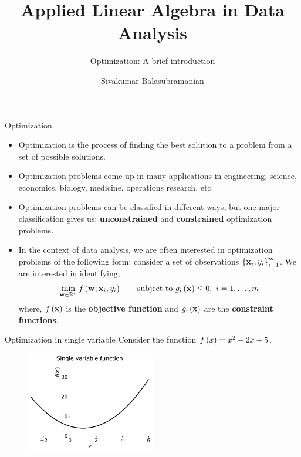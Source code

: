 \documentclass[aspectratio=169]{beamer}
\title{Applied Linear Algebra in Data Analysis}
\subtitle{Optimization: A brief introduction}
\author{Sivakumar Balasubramanian}
\institute[Christian Medical College] %
{
  \inst{}%
  Department of Bioengineering\\
  Christian Medical College, Bagayam\\
  Vellore 632002
}
\date{}
\let\olditem\item
\renewcommand{\item}{\setlength{\itemsep}{\fill}\olditem}
\def\mf{\ensuremath\mathbf}
\def\mb{\ensuremath\mathbb}
\def\lp{\ensuremath\left(}
\def\rp{\ensuremath\right)}
\def\lc{\ensuremath\left\{}
\def\rc{\ensuremath\right\}}
\newcommand{\ct}[1]{\lp #1\rp}
\begin{document}


\begin{frame}
  \titlepage
\end{frame}



\begin{frame}[t]{Optimization}
\begin{itemize}
  \item Optimization is the process of finding the best solution to a problem from a set of possible solutions.
  \item Optimization problems come up in many applications in engineering, science, economics, biology, medicine, operations research, etc.
  \item Optimization problems can be classified in different ways, but one major classification gives us: \textbf{unconstrained} and \textbf{constrained} optimization problems.
  \item In the context of data analysis, we are often interested in optimization problems of the following form: consider a set of observations $\lc \mf{x}_i, y_i\rc_{i=1}^m$. We are interested in identifying,
  \[ \min_{\mf{w} \in \mb{R}^n} f\ct{\mf{w}; \mf{x}_i, y_i} \quad \quad \mathrm{subject \,\, to} \,\, g_i\ct{\mf{x}} \leq 0, \,\, i = 1, \ldots, m \]
  where, $f\ct{\mf{x}}$ is the \textbf{objective function} and $g_i\ct{\mf{x}}$ are the \textbf{constraint functions}.
\end{itemize}
\end{frame}


\begin{frame}[t]{Optimization in single variable}
  Consider the function $f\ct{x} = x^2 - 2x + 5$.
  \begin{figure}
    \centering
    \includegraphics[width=0.5\textwidth]{figs/singlevarfunc.pdf}
  \end{figure}
\end{frame}
\end{document}
